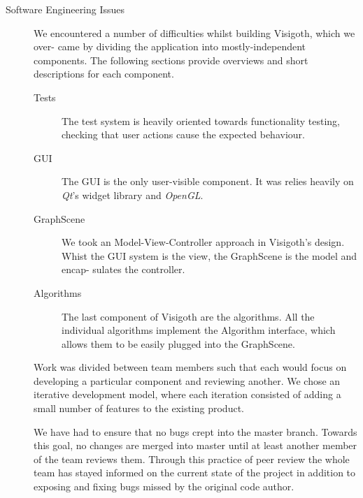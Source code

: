 \documentclass[a4paper,11pt]{article}
\newcommand{\buzz}[1]{\emph{#1}}
\newcommand{\Qt}{\buzz{Qt}}
\newcommand{\OpenGL}{\buzz{OpenGL}}
\begin{document}
\begin{description}
\item[Software Engineering Issues]

  We encountered a number of difficulties whilst building Visigoth,
  which we over- came by dividing the application into
  mostly-independent components.  The following sections provide
  overviews and short descriptions for each component.

  \begin{description}
  \item[Tests] The test system is heavily oriented towards
    functionality testing, checking that user actions cause the
    expected behaviour.

  \item[GUI] The GUI is the only user-visible component. It was relies
    heavily on \Qt's widget library and \OpenGL.

  \item[GraphScene] We took an Model-View-Controller approach in
    Visigoth's design. Whist the GUI system is the view, the
    GraphScene is the model and encap- sulates the controller.

  \item[Algorithms] The last component of Visigoth are the
    algorithms. All the individual algorithms implement the Algorithm
    interface, which allows them to be easily plugged into the
    GraphScene.
  \end{description}

  Work was divided between team members such that each would focus on
  developing a particular component and reviewing another. We chose an
  iterative development model, where each iteration consisted of
  adding a small number of features to the existing product.

  We have had to ensure that no bugs crept into the master
  branch. Towards this goal, no changes are merged into master until
  at least another member of the team reviews them. Through this
  practice of peer review the whole team has stayed informed on the
  current state of the project in addition to exposing and fixing bugs
  missed by the original code author.


\end{description}
\end{document}

